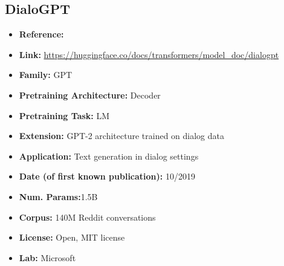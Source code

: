 \documentclass{article}
\begin{document}
\subsection{DialoGPT}
            \begin{itemize}
                \item \textbf{Reference:} 
                \item \textbf{Link:} \url{https://huggingface.co/docs/transformers/model_doc/dialogpt}
                \item \textbf{Family:} GPT 
                \item \textbf{Pretraining Architecture:} Decoder
                \item \textbf{Pretraining Task:} LM
                \item \textbf{Extension:} GPT-2 architecture trained on dialog data  
                \item \textbf{Application:} Text generation in dialog settings
                \item \textbf{Date (of first known publication):} 10/2019
                \item \textbf{Num. Params:}1.5B
                \item \textbf{Corpus:} 140M Reddit conversations
                \item \textbf{License:} Open, MIT license
                \item \textbf{Lab:} Microsoft
            \end{itemize}
            
\end{document}
